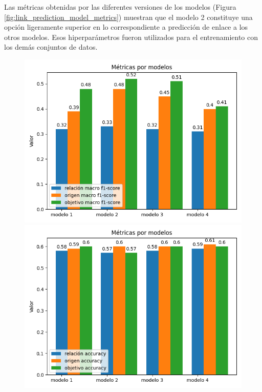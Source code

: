 Las métricas obtenidas por las diferentes versiones de los modelos 
(Figura \ref{fig:link_prediction_model_metrics}) 
muestran que el modelo 2 constituye una opción ligeramente superior en lo correspondiente a 
predicción de enlace a los otros modelos. Esos hiperparámetros
fueron utilizados para el entrenamiento con los demás conjuntos de datos.

\begin{figure}[h!]
	\begin{center}
		\includegraphics[scale=.4]{Graphics/persuasive_essays_all_linked_all_relation_f1_scores.png}
		\includegraphics[scale=.4]{Graphics/persuasive_essays_all_linked_all_relation_accuracy.png}\\

\end{center}
\end{figure}
